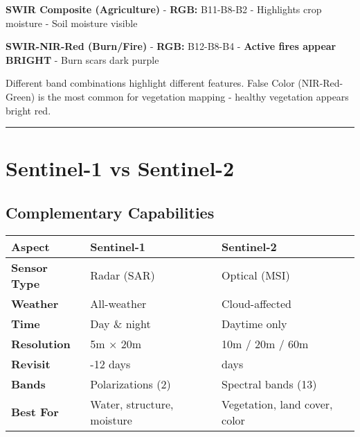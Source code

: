 \documentclass[
  letterpaper,
  DIV=11,
  numbers=noendperiod]{scrartcl}
\begin{document}
\textbf{SWIR Composite (Agriculture)} - \textbf{RGB:} B11-B8-B2 -
Highlights crop moisture - Soil moisture visible

\textbf{SWIR-NIR-Red (Burn/Fire)} - \textbf{RGB:} B12-B8-B4 -
\textbf{Active fires appear BRIGHT} - Burn scars dark purple

Different band combinations highlight different features. False Color
(NIR-Red-Green) is the most common for vegetation mapping - healthy
vegetation appears bright red.

\begin{center}\rule{0.5\linewidth}{0.5pt}\end{center}

\section{Sentinel-1 vs Sentinel-2}\label{sentinel-1-vs-sentinel-2}

\subsection{Complementary
Capabilities}\label{complementary-capabilities}

\begin{longtable}[]{@{}
  >{\raggedright\arraybackslash}p{}
  >{\raggedright\arraybackslash}p{}
  >{\raggedright\arraybackslash}p{}@{}}
\toprule\noalign{}
\begin{minipage}[b]{\linewidth}\raggedright
\textbf{Aspect}
\end{minipage} & \begin{minipage}[b]{\linewidth}\raggedright
\textbf{Sentinel-1}
\end{minipage} & \begin{minipage}[b]{\linewidth}\raggedright
\textbf{Sentinel-2}
\end{minipage} \\
\midrule\noalign{}
\endhead
\bottomrule\noalign{}
\endlastfoot
\textbf{Sensor Type} & Radar (SAR) & Optical (MSI) \\
\textbf{Weather} & All-weather & Cloud-affected \\
\textbf{Time} & Day \& night & Daytime only \\
\textbf{Resolution} & 5m × 20m & 10m / 20m / 60m \\
\textbf{Revisit} & 6-12 days & 5 days \\
\textbf{Bands} & Polarizations (2) & Spectral bands (13) \\
\textbf{Best For} & Water, structure, moisture & Vegetation, land cover,
color \\
\end{longtable}
\end{document}
